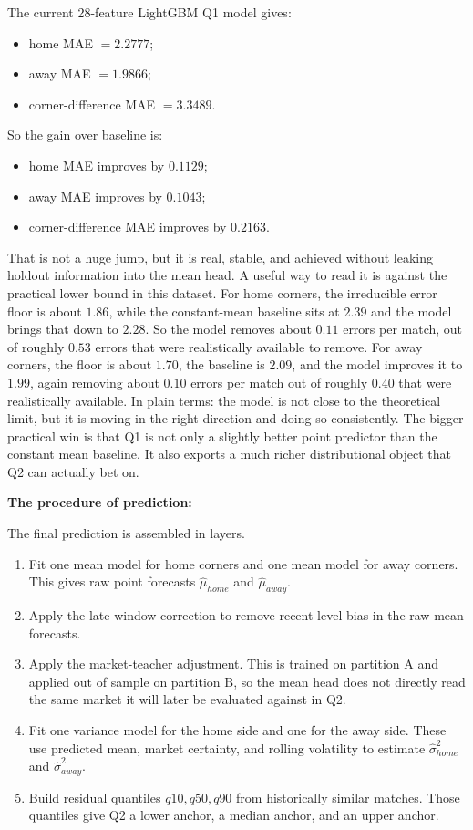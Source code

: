 \documentclass{article}
\begin{document}
The current 28-feature LightGBM Q1 model gives:
\begin{itemize}
    \item home MAE \(= 2.2777\);
    \item away MAE \(= 1.9866\);
    \item corner-difference MAE \(= 3.3489\).
\end{itemize}

So the gain over baseline is:
\begin{itemize}
    \item home MAE improves by \(0.1129\);
    \item away MAE improves by \(0.1043\);
    \item corner-difference MAE improves by \(0.2163\).
\end{itemize}

That is not a huge jump, but it is real, stable, and achieved without leaking holdout information into the mean head. A useful way to read it is against the practical lower bound in this dataset. For home corners, the irreducible error floor is about \(1.86\), while the constant-mean baseline sits at \(2.39\) and the model brings that down to \(2.28\). So the model removes about \(0.11\) errors per match, out of roughly \(0.53\) errors that were realistically available to remove. For away corners, the floor is about \(1.70\), the baseline is \(2.09\), and the model improves it to \(1.99\), again removing about \(0.10\) errors per match out of roughly \(0.40\) that were realistically available. In plain terms: the model is not close to the theoretical limit, but it is moving in the right direction and doing so consistently. The bigger practical win is that Q1 is not only a slightly better point predictor than the constant mean baseline. It also exports a much richer distributional object that Q2 can actually bet on.

\bigskip

\noindent \textbf{The procedure of prediction:}

\noindent The final prediction is assembled in layers.
\begin{enumerate}
    \item Fit one mean model for home corners and one mean model for away corners. This gives raw point forecasts \(\hat{\mu}_{home}\) and \(\hat{\mu}_{away}\).
    \item Apply the late-window correction to remove recent level bias in the raw mean forecasts.
    \item Apply the market-teacher adjustment. This is trained on partition A and applied out of sample on partition B, so the mean head does not directly read the same market it will later be evaluated against in Q2.
    \item Fit one variance model for the home side and one for the away side. These use predicted mean, market certainty, and rolling volatility to estimate \(\hat{\sigma}^{2}_{home}\) and \(\hat{\sigma}^{2}_{away}\).
    \item Build residual quantiles \(q10, q50, q90\) from historically similar matches. Those quantiles give Q2 a lower anchor, a median anchor, and an upper anchor.
\end{enumerate}
\end{document}
